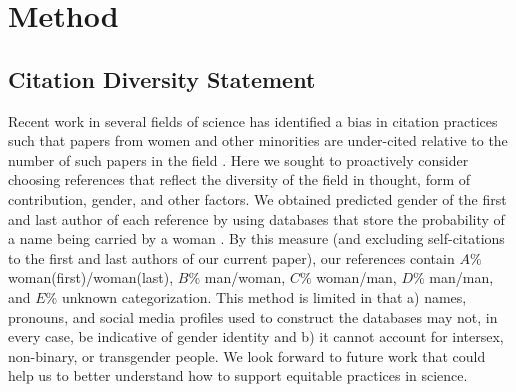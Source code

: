 \documentclass[12pt]{article}
\begin{document}
\section{Method}
\subsection{Citation Diversity Statement}

Recent work in several fields of science has identified a bias in citation practices such that papers from women and other minorities are under-cited relative to the number of such papers in the field \cite{mitchell2013gendered,dion2018gendered,caplar2017quantitative, maliniak2013gender, Dworkin2020.01.03.894378}. Here we sought to proactively consider choosing references that reflect the diversity of the field in thought, form of contribution, gender, and other factors. We obtained predicted gender of the first and last author of each reference by using databases that store the probability of a name being carried by a woman \cite{Dworkin2020.01.03.894378,zhou_dale_2020_3672110}. By this measure (and excluding self-citations to the first and last authors of our current paper), our references contain $A\%$ woman(first)/woman(last), $B\%$ man/woman, $C\%$ woman/man, $D\%$ man/man, and $E\%$ unknown categorization. This method is limited in that a) names, pronouns, and social media profiles used to construct the databases may not, in every case, be indicative of gender identity and b) it cannot account for intersex, non-binary, or transgender people. We look forward to future work that could help us to better understand how to support equitable practices in science.

\newpage


\end{document}
